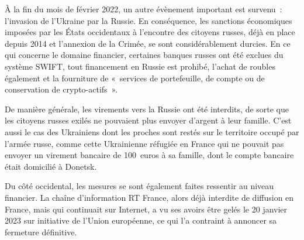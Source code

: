 À la fin du mois de février 2022, un autre évènement important est survenu~: l'invasion de l'Ukraine par la Russie. En conséquence, les sanctions économiques imposées par les États occidentaux à l'encontre des citoyens russes, déjà en place depuis 2014 et l'annexion de la Crimée, se sont considérablement durcies. En ce qui concerne le domaine financier, certaines banques russes ont été exclues du système SWIFT, tout financement en Russie est prohibé, l'achat de roubles également et la fourniture de «~services de portefeuille, de compte ou de conservation de crypto-actifs~». %

De manière générale, les virements vers la Russie ont été interdits, de sorte que les citoyens russes exilés ne pouvaient plus envoyer d'argent à leur famille. C'est aussi le cas des Ukrainiens dont les proches sont restés sur le territoire occupé par l'armée russe, comme cette Ukrainienne réfugiée en France qui ne pouvait pas envoyer un virement bancaire de 100~euros à sa famille, dont le compte bancaire était domicilié à Donetsk.

Du côté occidental, les mesures se sont également faites ressentir au niveau financier. La chaîne d'information RT France, alors déjà interdite de diffusion en France, mais qui continuait sur Internet, a vu ses avoirs être gelés le 20 janvier 2023 sur initiative de l'Union européenne, ce qui l'a contraint à annoncer sa fermeture définitive.

